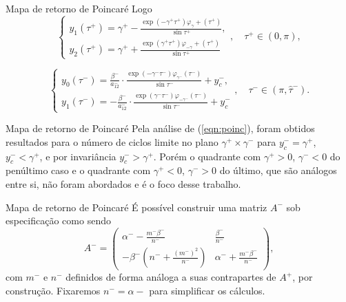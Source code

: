 \documentclass[aspectratio=169]{beamer}
\begin{document}
\begin{frame}{Mapa de retorno de Poincaré}
    Logo
\begin{equation}
\label{righttime}
\left\{\begin{array}{l}
y_{1}\left(\tau^{+}\right)=\gamma^{+}-\frac{\exp \left(-\gamma^{+} \tau^{+}\right) \varphi_{\gamma}+\left(\tau^{+}\right)}{\sin \tau^{+}}, \\
y_{2}\left(\tau^{+}\right)=\gamma^{+}+\frac{\exp \left(\gamma^{+} \tau^{+}\right)  \varphi_{-\gamma}+\left(\tau^{+}\right)}{\sin \tau^{+}}
\end{array}, \quad \tau^{+} \in(0, \pi)\right.,
\end{equation}

\begin{equation}
\label{lefttime}
\left\{\begin{array}{l}
y_{0}\left(\tau^{-}\right)=\frac{\beta^{-}}{a_{12}^{-}} \cdot \frac{\exp \left(-\gamma^{-} \tau^{-}\right)  \varphi_{\gamma^{-}}\left(\tau^{-}\right)}{\sin \tau^{-}}+y_{c}^{-}, \\
y_{1}\left(\tau^{-}\right)=-\frac{\beta^{-}}{a_{12}^{-}} \cdot \frac{\exp \left(\gamma^{-} \tau^{-}\right)  \varphi_{-\gamma^{-}}\left(\tau^{-}\right)}{\sin \tau^{-}}+y_{c}^{-}
\end{array}\right., \quad \tau^{-} \in\left(\pi, \hat{\tau}^{-}\right).
\end{equation}
\end{frame}

\begin{frame}{Mapa de retorno de Poincaré}
    Pela análise de (\ref{eqn:poinc}), foram obtidos resultados para o número de ciclos limite no plano $\gamma^+\times\gamma^-$ para $y^−_c=\gamma^+$, $y_c^-<\gamma^+$, e por invariância $y_c^->\gamma^+$. Porém o quadrante com $\gamma^+>0$, $\gamma^-<0$ do penúltimo caso e o quadrante com $\gamma^+<0$, $\gamma^->0$ do último, que são análogos entre si, não foram abordados e é o foco desse trabalho.
\end{frame}

\begin{frame}{Mapa de retorno de Poincaré}
    É possível construir uma matriz $A^-$ sob especificação como sendo
    \[
A^-=
\begin{pmatrix}
\alpha^--\frac{m^-\beta^-}{n^-}& \frac{\beta^-}{n^-}\\ 
-\beta^-\left(n^-+\frac{(m^-)^2}{n^-}\right)& \alpha^-+\frac{m^-\beta^-}{n^-}
\end{pmatrix},
\]\pause
com $m^-$ e $n^-$ definidos de forma análoga a suas contrapartes de $A^+$, por construção. Fixaremos $n^-=\alpha-$ para simplificar os cálculos.
\end{frame}
\end{document}
